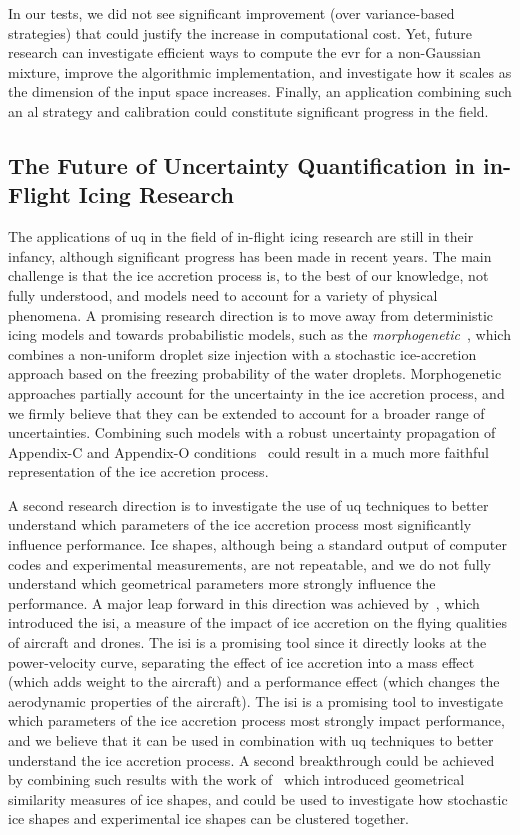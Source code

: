 \smallskip
In our tests, we did not see significant improvement (over variance-based strategies) that could justify the increase in computational cost. Yet, future research can investigate efficient ways to compute the \gls{evr} for a non-Gaussian mixture, improve the algorithmic implementation, and investigate how it scales as the dimension of the input space increases. Finally, an application combining such an \gls{al} strategy and calibration could constitute significant progress in the field.

\subsection{The Future of Uncertainty Quantification in in-Flight Icing Research}

The applications of \gls{uq} in the field of in-flight icing research are still in their infancy, although significant progress has been made in recent years. The main challenge is that the ice accretion process is, to the best of our knowledge, not fully understood, and models need to account for a variety of physical phenomena. A promising research direction is to move away from deterministic icing models and towards probabilistic models, such as the \textit{morphogenetic}~\cite{bellosta2024multi}, which combines a non-uniform droplet size injection with a stochastic ice-accretion approach based on the freezing probability of the water droplets. Morphogenetic approaches partially account for the uncertainty in the ice accretion process, and we firmly believe that they can be extended to account for a broader range of uncertainties. Combining such models with a robust uncertainty propagation of Appendix-C and Appendix-O conditions~\cite{Bellosta2021} could result in a much more faithful representation of the ice accretion process. 

\smallskip
A second research direction is to investigate the use of \gls{uq} techniques to better understand which parameters of the ice accretion process most significantly influence performance. Ice shapes, although being a standard output of computer codes and experimental measurements, are not repeatable, and we do not fully understand which geometrical parameters more strongly influence the performance. A major leap forward in this direction was achieved by~\cite{isi}, which introduced the \gls{isi}, a measure of the impact of ice accretion on the flying qualities of aircraft and drones. The \gls{isi} is a promising tool since it directly looks at the power-velocity curve, separating the effect of ice accretion into a mass effect (which adds weight to the aircraft) and a performance effect (which changes the aerodynamic properties of the aircraft). The \gls{isi} is a promising tool to investigate which parameters of the ice accretion process most strongly impact performance, and we believe that it can be used in combination with \gls{uq} techniques to better understand the ice accretion process. A second breakthrough could be achieved by combining such results with the work of~\cite{donizetti2026geometrical} which introduced geometrical similarity measures of ice shapes, and could be used to investigate how stochastic ice shapes and experimental ice shapes can be clustered together.

